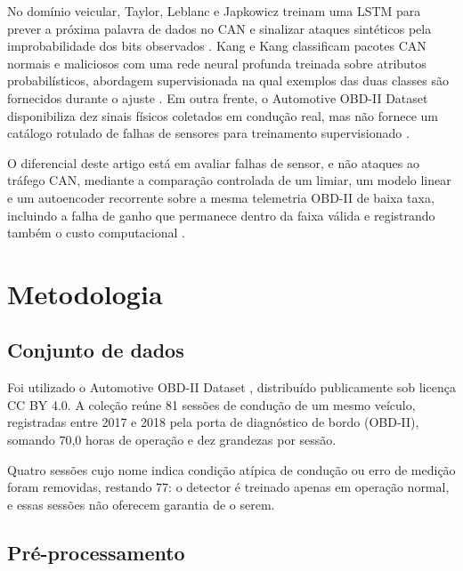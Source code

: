 \documentclass[conference]{IEEEtran}
\begin{document}
No domínio veicular, Taylor, Leblanc e Japkowicz treinam uma LSTM para prever a próxima palavra de dados no CAN e sinalizar ataques sintéticos pela improbabilidade dos bits observados \cite{taylor2016automobile}.
Kang e Kang classificam pacotes CAN normais e maliciosos com uma rede neural profunda treinada sobre atributos probabilísticos, abordagem supervisionada na qual exemplos das duas classes são fornecidos durante o ajuste \cite{kang2016intrusion}.
Em outra frente, o Automotive OBD-II Dataset disponibiliza dez sinais físicos coletados em condução real, mas não fornece um catálogo rotulado de falhas de sensores para treinamento supervisionado \cite{weber2023automotive}.

O diferencial deste artigo está em avaliar falhas de sensor, e não ataques ao tráfego CAN, mediante a comparação controlada de um limiar, um modelo linear e um autoencoder recorrente sobre a mesma telemetria OBD-II de baixa taxa, incluindo a falha de ganho que permanece dentro da faixa válida e registrando também o custo computacional \cite{chandola2009anomaly,lakhina2004diagnosing,malhotra2016lstm,taylor2016automobile,kang2016intrusion,weber2023automotive}.

\section{Metodologia}

\subsection{Conjunto de dados}

Foi utilizado o Automotive OBD-II Dataset \cite{weber2023automotive}, distribuído publicamente sob licença CC BY 4.0.
A coleção reúne 81 sessões de condução de um mesmo veículo, registradas entre 2017 e 2018 pela porta de diagnóstico de bordo (OBD-II), somando 70,0 horas de operação e dez grandezas por sessão.

Quatro sessões cujo nome indica condição atípica de condução ou erro de medição foram removidas, restando 77: o detector é treinado apenas em operação normal, e essas sessões não oferecem garantia de o serem.

\subsection{Pré-processamento}
\end{document}
